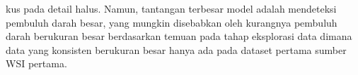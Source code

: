 kus pada detail halus. Namun, tantangan terbesar model adalah mendeteksi pembuluh darah besar, yang mungkin disebabkan oleh kurangnya pembuluh darah berukuran besar berdasarkan temuan pada tahap eksplorasi data dimana data yang konsisten berukuran besar hanya ada pada dataset pertama sumber WSI pertama.















